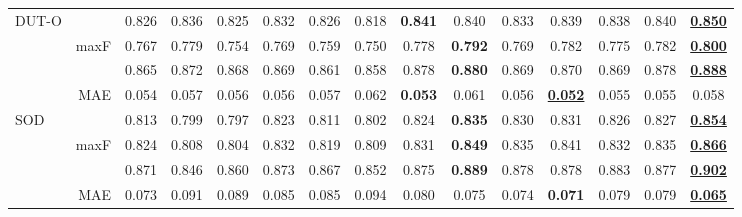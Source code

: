 \documentclass[10pt,twocolumn,letterpaper]{article}
\def\blu#1{\textbf{\color{blue} #1}} \def\red#1{\textbf{\color{red}\underline{#1}}}
\begin{document}
\begin{table*}[t]
\begin{tabular}{lr|cccccccccccc|c}
  \multirow{4}{*}{DUT-O}
    &   &0.826 &0.836 &0.825 &0.832 &0.826 &0.818 &\blu{0.841} &0.840 &0.833 &0.839 &0.838 &0.840 &\red{0.850} \\
    & maxF  &0.767 &0.779 &0.754 &0.769 &0.759 &0.750 &0.778 &\blu{0.792} &0.769 &0.782 &0.775 &0.782 &\red{0.800}\\
    &  &0.865 &0.872 &0.868 &0.869 &0.861 &0.858 &0.878 &\blu{0.880} &0.869 &0.870 &0.869 &0.878 &\red{0.888}\\
    \cite{yang2013DUTO} & MAE &0.054 &0.057 &0.056 &0.056 &0.057 &0.062 &\blu{0.053} &0.061 &0.056 &\red{0.052} &0.055 &0.055 &0.058\\
     \hline

  \multirow{4}{*}{SOD}
    &    &0.813 &0.799 &0.797 &0.823 &0.811 &0.802 &0.824 &\blu{0.835} &0.830 &0.831 &0.826 &0.827 &\red{0.854} \\
    & maxF  &0.824 &0.808 &0.804 &0.832 &0.819 &0.809 &0.831 &\blu{0.849} &0.835 &0.841 &0.832 &0.835 &\red{0.866} \\
    &   &0.871 &0.846 &0.860 &0.873 &0.867 &0.852 &0.875 &\blu{0.889} &0.878 &0.878 &0.883 &0.877 &\red{0.902}\\
    \cite{movahedi2010SOD}& MAE  &0.073 &0.091 &0.089 &0.085 &0.085 &0.094 &0.080 &0.075 &0.074 &\blu{0.071} &0.079 &0.079 &\red{0.065}\\
     \hline


  \end{tabular}
  \label{RGB_SOTA}
\end{table*}
\end{document}
